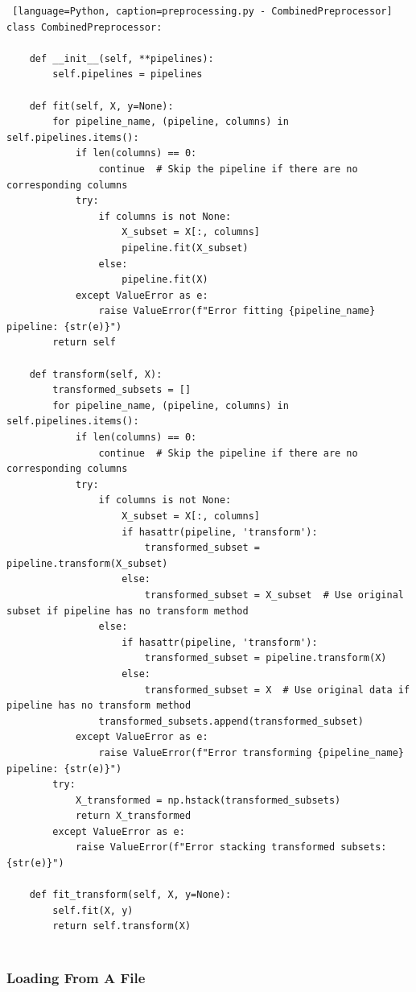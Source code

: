 \documentclass[letterpaper,10pt]{article}
\begin{document}
\begin{lstlisting} [language=Python, caption=preprocessing.py - CombinedPreprocessor] 
class CombinedPreprocessor:

    def __init__(self, **pipelines):
        self.pipelines = pipelines

    def fit(self, X, y=None):
        for pipeline_name, (pipeline, columns) in self.pipelines.items():
            if len(columns) == 0:
                continue  # Skip the pipeline if there are no corresponding columns
            try:
                if columns is not None:
                    X_subset = X[:, columns]
                    pipeline.fit(X_subset)
                else:
                    pipeline.fit(X)
            except ValueError as e:
                raise ValueError(f"Error fitting {pipeline_name} pipeline: {str(e)}")
        return self

    def transform(self, X):
        transformed_subsets = []
        for pipeline_name, (pipeline, columns) in self.pipelines.items():
            if len(columns) == 0:
                continue  # Skip the pipeline if there are no corresponding columns
            try:
                if columns is not None:
                    X_subset = X[:, columns]
                    if hasattr(pipeline, 'transform'):
                        transformed_subset = pipeline.transform(X_subset)
                    else:
                        transformed_subset = X_subset  # Use original subset if pipeline has no transform method
                else:
                    if hasattr(pipeline, 'transform'):
                        transformed_subset = pipeline.transform(X)
                    else:
                        transformed_subset = X  # Use original data if pipeline has no transform method
                transformed_subsets.append(transformed_subset)
            except ValueError as e:
                raise ValueError(f"Error transforming {pipeline_name} pipeline: {str(e)}")
        try:
            X_transformed = np.hstack(transformed_subsets)
            return X_transformed
        except ValueError as e:
            raise ValueError(f"Error stacking transformed subsets: {str(e)}")

    def fit_transform(self, X, y=None):
        self.fit(X, y)
        return self.transform(X)


\end{lstlisting}
\subsubsection{Loading From A File}\label{fileloading}
\end{document}
